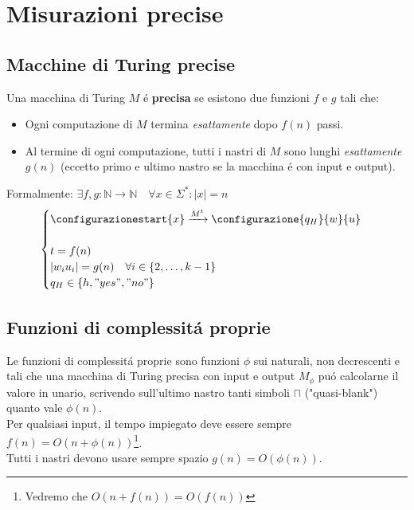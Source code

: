 
\section{Misurazioni precise}

\subsection{Macchine di Turing precise}
Una macchina di Turing $M$ é \textbf{precisa} se esistono due funzioni $f$ e $g$ tali che:
\begin{itemize}
	\item Ogni computazione di $M$ termina \textit{esattamente} dopo $f(n)$ passi.
	\item Al termine di ogni computazione, tutti i nastri di $M$ sono lunghi \textit{esattamente} $g(n)$ (eccetto primo e ultimo nastro se la macchina é con input e output).
\end{itemize}
Formalmente: $\exists f, g: \mathbb{N} \rightarrow \mathbb{N}  \quad \forall x \in \Sigma^* : |x| = n$
\[
\begin{cases}
	\configurazionestart{x} \xrightarrow{{M}^t} \configurazione{q_H}{w}{u} \\
	\\
	t = f(n) \\
	|w_i u_i|= g(n) \quad \forall i \in \{2, \dots, k-1\} \\
	q_H \in \{h, "yes", "no"\}
\end{cases}
\]

\subsection{Funzioni di complessitá proprie}
Le funzioni di complessitá proprie sono funzioni $\phi$ sui naturali, non decrescenti e tali che una macchina di Turing precisa con input e output $M_\phi$ puó calcolarne il valore in unario, scrivendo sull'ultimo nastro tanti simboli $\sqcap$ ("quasi-blank") quanto vale $\phi(n)$. \\
Per qualsiasi input, il tempo impiegato deve essere sempre $f(n) = O(n + \phi(n))$\footnote{Vedremo che $O(n + f(n)) = O(f(n))$}. \\
Tutti i nastri devono usare sempre spazio $g(n) = O(\phi(n))$. \\

